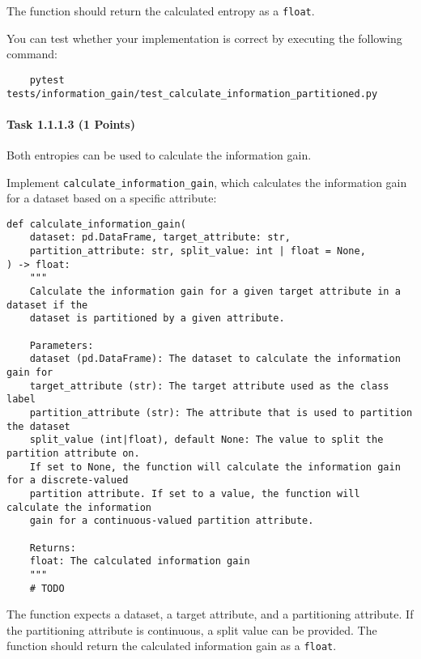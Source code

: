 \documentclass[
english,
smallborders
]{i6prcsht}
\newcommand{\points}[1]{\hfill \color{red}(#1 Points)\color{black}}
\begin{document}
The function should return the calculated entropy as a \texttt{float}.

You can test whether your implementation is correct by executing the following command:

\vspace*{0.3cm}

\begin{lstlisting}
	pytest tests/information_gain/test_calculate_information_partitioned.py
\end{lstlisting}

\vspace*{0.1cm}

\paragraph*{Task 1.1.1.3 \points{1}} \hfill

Both entropies can be used to calculate the information gain.

Implement \texttt{calculate\_information\_gain}, which calculates the information gain for a dataset based on a specific attribute:

\vspace*{0.3cm}

\begin{lstlisting}
def calculate_information_gain(
	dataset: pd.DataFrame, target_attribute: str,
	partition_attribute: str, split_value: int | float = None,
) -> float:
	"""
	Calculate the information gain for a given target attribute in a dataset if the
	dataset is partitioned by a given attribute.

	Parameters:
	dataset (pd.DataFrame): The dataset to calculate the information gain for
	target_attribute (str): The target attribute used as the class label
	partition_attribute (str): The attribute that is used to partition the dataset
	split_value (int|float), default None: The value to split the partition attribute on.
	If set to None, the function will calculate the information gain for a discrete-valued
	partition attribute. If set to a value, the function will calculate the information
	gain for a continuous-valued partition attribute.

	Returns:
	float: The calculated information gain
	"""
	# TODO
\end{lstlisting}

\vspace*{0.1cm}

The function expects a dataset, a target attribute, and a partitioning attribute. If the partitioning attribute is continuous, a split value can be provided. The function should return the calculated information gain as a \texttt{float}.
\end{document}
